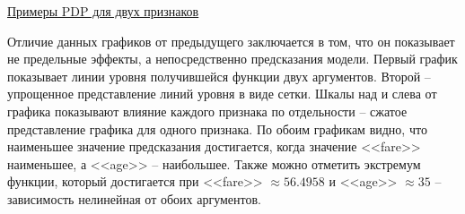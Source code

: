 \underline{Примеры PDP для двух признаков} \cite{pdpgit}
\vspace{-3mm}

\begin{figure}[h]
\end{figure}
\vspace{-5mm}
\begin{figure}[h!]
\end{figure}

Отличие данных графиков от предыдущего заключается в том, что он показывает не предельные эффекты, а непосредственно предсказания модели. Первый график показывает линии уровня получившейся функции двух аргументов. Второй -- упрощенное представление линий уровня в виде сетки. Шкалы над и слева от графика показывают влияние каждого признака по отдельности -- сжатое представление графика для одного признака. По обоим графикам видно, что наименьшее значение предсказания достигается, когда значение <<fare>> наименьшее, а <<age>> -- наибольшее. Также можно отметить экстремум функции, который достигается при <<fare>> $\approx 56.4958$ и <<age>> $\approx 35$ -- зависимость нелинейная от обоих аргументов.